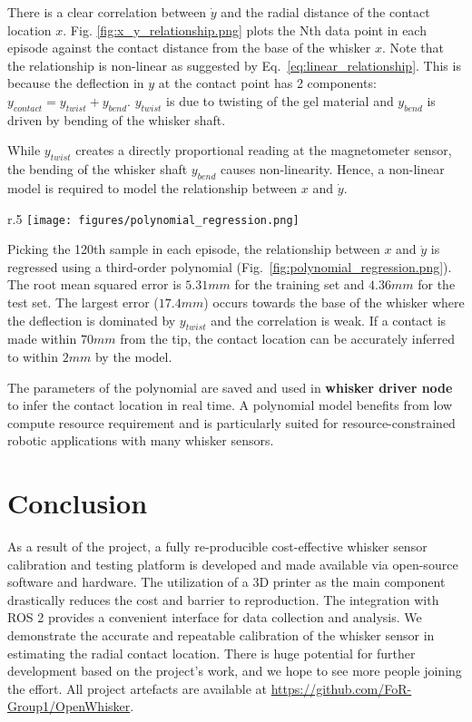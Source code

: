 \documentclass[runningheads]{llncs}
\begin{document}
There is a clear correlation between \(\dot{y}\) and the radial distance of the contact location \(x\). Fig. \ref*{fig:x_y_relationship.png} plots the Nth data point in each episode against the contact distance from the base of the whisker \(x\). Note that the relationship is non-linear as suggested by Eq.~\ref*{eq:linear_relationship}. This is because the deflection in \(y\) at the contact point has 2 components: \(y_{contact} = y_{twist} + y_{bend}\). \(y_{twist}\) is due to twisting of the gel material and \(y_{bend}\) is driven by bending of the whisker shaft.

While \(y_{twist}\) creates a directly proportional reading at the magnetometer sensor, the bending of the whisker shaft \(y_{bend}\) causes non-linearity. Hence, a non-linear model is required to model the relationship between \(x\) and \(\dot{y}\).

\begin{wrapfigure}{r}{.5\textwidth}
    \centering
    \texttt{[image: figures/polynomial\_regression.png]}
    \caption{Polynomial Regression of the relationship between 120th sample of \(\dot{y}\) in each episode and the radial contact distance \(x\)}
    \label{fig:polynomial_regression.png}
\end{wrapfigure}

Picking the 120th sample in each episode, the relationship between \(x\) and \(\dot{y}\) is regressed using a third-order polynomial (Fig.~\ref*{fig:polynomial_regression.png}). The root mean squared error is $5.31 mm$ for the training set and $4.36 mm$ for the test set.  The largest error ($17.4 mm$) occurs towards the base of the whisker where the deflection is dominated by $y_{twist}$ and the correlation is weak. If a contact is made within $70 mm$ from the tip, the contact location can be accurately inferred to within $2 mm$ by the model.

The parameters of the polynomial are saved and used in \textbf{whisker driver node} to infer the contact location in real time. A polynomial model benefits from low compute resource requirement and is particularly suited for resource-constrained robotic applications with many whisker sensors.

\section{Conclusion}

As a result of the project, a fully re-producible cost-effective whisker sensor calibration and testing platform is developed and made available via open-source software and hardware. The utilization of a 3D printer as the main component drastically reduces the cost and barrier to reproduction. The integration with ROS 2 provides a convenient interface for data collection and analysis. We demonstrate the accurate and repeatable calibration of the whisker sensor in estimating the radial contact location. There is huge potential for further development based on the project's work, and we hope to see more people joining the effort. All project artefacts are available at \url{https://github.com/FoR-Group1/OpenWhisker}.


\end{document}
